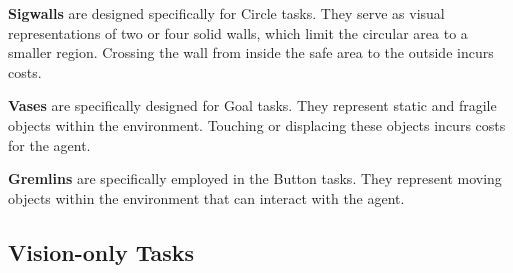 \documentclass{article}
\begin{document}
\textbf{Sigwalls} are designed specifically for Circle tasks. They serve as visual representations of two or four solid walls, which limit the circular area to a smaller region. Crossing the wall from inside the safe area to the outside incurs costs.

\textbf{Vases} are specifically designed for Goal tasks. They represent static and fragile objects within the environment. Touching or displacing these objects incurs costs for the agent.

\textbf{Gremlins} are specifically employed in the Button tasks. They represent moving objects within the environment that can interact with the agent.

\subsection{Vision-only Tasks}
\label{app:vision-only-tasks}
\end{document}
